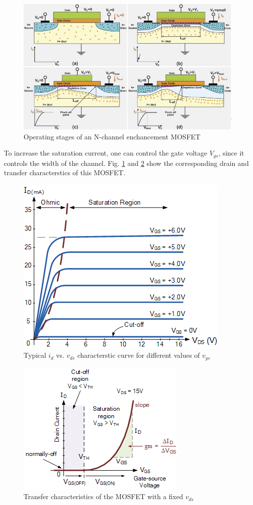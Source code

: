 \begin{figure}[H]
    \centering
    \includegraphics[width=1\columnwidth]{images/stages.jpg}
    \caption{Operating stages of an N-channel enchancement MOSFET}
\end{figure}

To increase the saturation current, one can control the gate voltage $V_{gs}$, since it controls the width of the channel. Fig. \ref{drain} and \ref{trans} show the corresponding drain and transfer characterstics of this MOSFET.

\begin{figure}[H]
    \centering
    \includegraphics[width=0.58\columnwidth]{images/drain.png}
    \caption{Typical $i_d$ vs. $v_{ds}$ characterstic curve for different values of $v_{gs}$}
    \label{drain}
\end{figure}

\begin{figure}[H]
    \centering
    \includegraphics[width=0.5\columnwidth]{images/trans.png}
    \caption{Transfer characteristics of the MOSFET with a fixed $v_{ds}$}
    \label{trans}
\end{figure}

